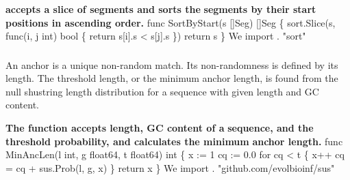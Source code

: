 \subsubsection{}
\textbf{ accepts a slice of segments  and sorts the}
\textbf{segments by their start positions in ascending order.}
\nwenddocs{}\endmoddef\nwstartdeflinemarkup{}\nwenddeflinemarkup
func SortByStart(s []Seg) []Seg \{
        sort.Slice(s, func(i, j int) bool \{
                return s[i].s < s[j].s
        \})
        return s
\}
\nwendcode{}\nwdocspar
We import .
\nwenddocs{}\endmoddef\nwstartdeflinemarkup{}\nwenddeflinemarkup
"sort"
\nwendcode{}\nwdocspar
\subsubsection{}
An anchor is a unique non-random match. Its non-randomness is defined
by its length. The threshold length, or the minimum anchor length, is
found from the null shustring length distribution for a sequence with
given length and GC content.

\textbf{The function  accepts length, GC content of a}
\textbf{sequence, and the threshold probability, and calculates the minimum}
\textbf{anchor length.}
\nwenddocs{}\endmoddef\nwstartdeflinemarkup{}\nwenddeflinemarkup
func MinAncLen(l int, g float64, t float64) int \{
          x := 1
          cq := 0.0 
          for cq < t \{
                  x++
                  cq = cq + sus.Prob(l, g, x)
          \}
          return x
\}
\nwendcode{}\nwdocspar
We import .
\nwenddocs{}\plusendmoddef\nwstartdeflinemarkup{}\nwenddeflinemarkup
"github.com/evolbioinf/sus"
\nwendcode{}\nwdocspar
